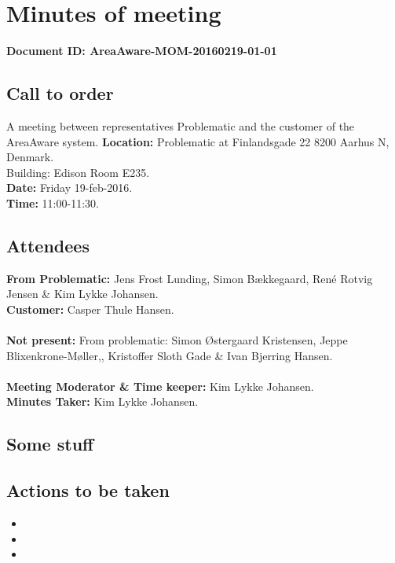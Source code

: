 %
\thispagestyle{fancy}
\chapter*{Minutes of meeting}
\textbf{Document ID: AreaAware-MOM-20160219-01-01} 


\section*{Call to order}
A meeting between representatives Problematic and the customer of the AreaAware system.
\textbf{Location:} Problematic at Finlandsgade 22 8200 Aarhus N, Denmark.\\ Building: Edison Room E235.\\
\textbf{Date:} Friday 19-feb-2016. \\
\textbf{Time:} 11:00-11:30.

\section*{Attendees}
\textbf{From Problematic:} Jens Frost Lunding, Simon Bækkegaard, René Rotvig Jensen \& Kim Lykke Johansen.\\
\textbf{Customer:} Casper Thule Hansen.\\\\
\textbf{Not present:} From problematic: Simon Østergaard Kristensen, Jeppe Blixenkrone-Møller,, Kristoffer Sloth Gade \& Ivan Bjerring Hansen.\\\\
\textbf{Meeting Moderator \& Time keeper:} Kim Lykke Johansen. \\
\textbf{Minutes Taker:} Kim Lykke Johansen.

\section*{Some stuff}


\section*{Actions to be taken}
\begin{itemize}
    \item 
    \item 
    \item 
\end{itemize}
